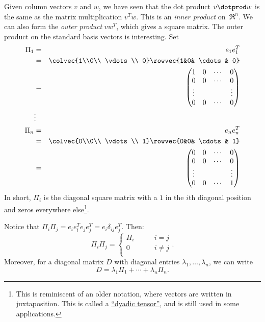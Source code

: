 Given column vectors $v$ and $w$, we have seen that the dot product $v\dotprod w$ is the same as the matrix multiplication $v^Tw$.  This is an \emph{inner product} on~$\Re^n$.  We can also form the \emph{outer product} $vw^T$, which gives a square matrix.
The outer product on the standard basis vectors is interesting.  Set 
\begin{eqnarray*}
\Pi_1 &=& e_1e_1^T \\
  &=& \colvec{1\\0\\ \vdots \\ 0} \rowvec{1&0& \cdots & 0}\\
  &=& \begin{pmatrix}
      1 & 0 & \cdots & 0 \\
      0 & 0 & \cdots & 0 \\
      \vdots & & & \vdots \\
      0 & 0 &\cdots & 0\\
      \end{pmatrix}\\
&\vdots& \\
\Pi_n &=& e_n e_n^T \\
  &=& \colvec{0\\0\\ \vdots \\ 1} \rowvec{0&0& \cdots & 1}\\
  &=& \begin{pmatrix}
      0 & 0 & \cdots & 0 \\
      0 & 0 & \cdots & 0 \\
      \vdots & & & \vdots \\
      0 & 0 &\cdots & 1\\
      \end{pmatrix}\\
\end{eqnarray*}
In short, $\Pi_i$ is the diagonal square matrix with a $1$ in the $i$th diagonal position and zeros everywhere else\footnote{This is reminiscent of an older notation, where vectors are written in juxtaposition.  This is called a \href{http://en.wikipedia.org/wiki/Dyadic_tensor}{``dyadic tensor''}, and is still used in some applications. }.

Notice that 
$\Pi_i\Pi_j=e_ie_i^Te_je_j^T=e_i\delta_{ij}e_j^T$.  Then:
\[
\Pi_i\Pi_j = \left\{ \begin{array}{cc}
\Pi_i & \qquad i=j \\
0 & \qquad i\neq j \\
\end{array}\right. .
\]
Moreover, for a diagonal matrix $D$ with diagonal entries $\lambda_1,\ldots, \lambda_n$, we can write
\[
D= \lambda_1\Pi_1 + \cdots + \lambda_n\Pi_n.
\]


